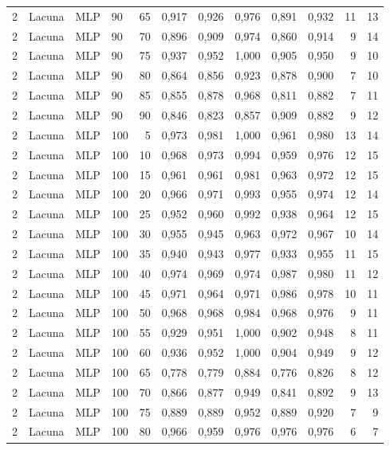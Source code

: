 \begin{longtable}{ccclrrrrrrrr}
2 & Lacuna & MLP & 90 & 65 & 0,917 & 0,926 & 0,976 & 0,891 & 0,932 & 11 & 13 \\
2 & Lacuna & MLP & 90 & 70 & 0,896 & 0,909 & 0,974 & 0,860 & 0,914 & 9 & 14 \\
2 & Lacuna & MLP & 90 & 75 & 0,937 & 0,952 & 1,000 & 0,905 & 0,950 & 9 & 10 \\
2 & Lacuna & MLP & 90 & 80 & 0,864 & 0,856 & 0,923 & 0,878 & 0,900 & 7 & 10 \\
2 & Lacuna & MLP & 90 & 85 & 0,855 & 0,878 & 0,968 & 0,811 & 0,882 & 7 & 11 \\
2 & Lacuna & MLP & 90 & 90 & 0,846 & 0,823 & 0,857 & 0,909 & 0,882 & 9 & 12 \\
2 & Lacuna & MLP & 100 & 5 & 0,973 & 0,981 & 1,000 & 0,961 & 0,980 & 13 & 14 \\
2 & Lacuna & MLP & 100 & 10 & 0,968 & 0,973 & 0,994 & 0,959 & 0,976 & 12 & 15 \\
2 & Lacuna & MLP & 100 & 15 & 0,961 & 0,961 & 0,981 & 0,963 & 0,972 & 12 & 15 \\
2 & Lacuna & MLP & 100 & 20 & 0,966 & 0,971 & 0,993 & 0,955 & 0,974 & 12 & 14 \\
2 & Lacuna & MLP & 100 & 25 & 0,952 & 0,960 & 0,992 & 0,938 & 0,964 & 12 & 15 \\
2 & Lacuna & MLP & 100 & 30 & 0,955 & 0,945 & 0,963 & 0,972 & 0,967 & 10 & 14 \\
2 & Lacuna & MLP & 100 & 35 & 0,940 & 0,943 & 0,977 & 0,933 & 0,955 & 11 & 15 \\
2 & Lacuna & MLP & 100 & 40 & 0,974 & 0,969 & 0,974 & 0,987 & 0,980 & 11 & 12 \\
2 & Lacuna & MLP & 100 & 45 & 0,971 & 0,964 & 0,971 & 0,986 & 0,978 & 10 & 11 \\
2 & Lacuna & MLP & 100 & 50 & 0,968 & 0,968 & 0,984 & 0,968 & 0,976 & 9 & 11 \\
2 & Lacuna & MLP & 100 & 55 & 0,929 & 0,951 & 1,000 & 0,902 & 0,948 & 8 & 11 \\
2 & Lacuna & MLP & 100 & 60 & 0,936 & 0,952 & 1,000 & 0,904 & 0,949 & 9 & 12 \\
2 & Lacuna & MLP & 100 & 65 & 0,778 & 0,779 & 0,884 & 0,776 & 0,826 & 8 & 12 \\
2 & Lacuna & MLP & 100 & 70 & 0,866 & 0,877 & 0,949 & 0,841 & 0,892 & 9 & 13 \\
2 & Lacuna & MLP & 100 & 75 & 0,889 & 0,889 & 0,952 & 0,889 & 0,920 & 7 & 9 \\
2 & Lacuna & MLP & 100 & 80 & 0,966 & 0,959 & 0,976 & 0,976 & 0,976 & 6 & 7 \\

\end{longtable}
